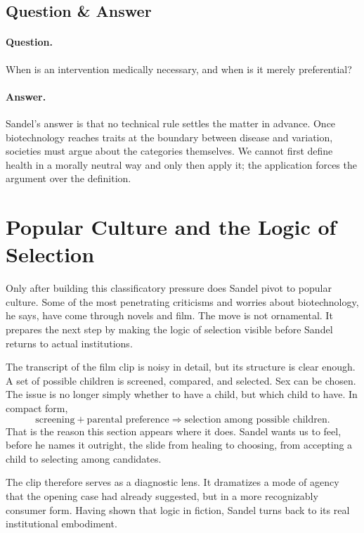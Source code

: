 \subsection{Question \& Answer}

\paragraph{Question.} When is an intervention medically necessary, and when is it merely preferential?

\paragraph{Answer.} Sandel's answer is that no technical rule settles the matter in advance. Once biotechnology reaches traits at the boundary between disease and variation, societies must argue about the categories themselves. We cannot first define health in a morally neutral way and only then apply it; the application forces the argument over the definition.

\section{Popular Culture and the Logic of Selection}

Only after building this classificatory pressure does Sandel pivot to popular culture. Some of the most penetrating criticisms and worries about biotechnology, he says, have come through novels and film. The move is not ornamental. It prepares the next step by making the logic of selection visible before Sandel returns to actual institutions.

The transcript of the film clip is noisy in detail, but its structure is clear enough. A set of possible children is screened, compared, and selected. Sex can be chosen. The issue is no longer simply whether to have a child, but which child to have. In compact form,
\begin{equation}
\text{screening} + \text{parental preference}
\Longrightarrow
\text{selection among possible children}.
\end{equation}
That is the reason this section appears where it does. Sandel wants us to feel, before he names it outright, the slide from healing to choosing, from accepting a child to selecting among candidates.

The clip therefore serves as a diagnostic lens. It dramatizes a mode of agency that the opening case had already suggested, but in a more recognizably consumer form. Having shown that logic in fiction, Sandel turns back to its real institutional embodiment.

